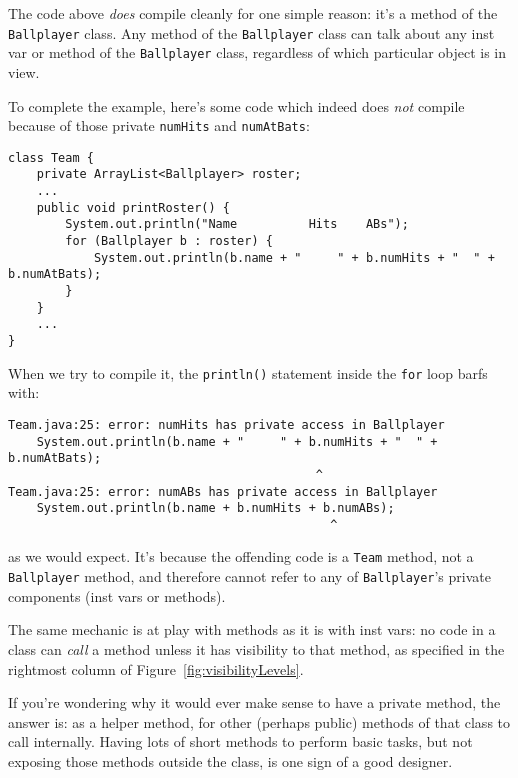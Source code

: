 The code above \textit{does} compile cleanly for one simple reason: it's a
method of the \texttt{Ballplayer} class. Any method of the \texttt{Ballplayer}
class can talk about any inst var or method of the \texttt{Ballplayer} class,
regardless of which particular object is in view.

To complete the example, here's some code which indeed does \textit{not}
compile because of those private \texttt{numHits} and \texttt{numAtBats}:

\begin{Verbatim}[fontsize=\footnotesize,samepage=true,frame=single]
class Team {
    private ArrayList<Ballplayer> roster;
    ...    
    public void printRoster() {
        System.out.println("Name          Hits    ABs");
        for (Ballplayer b : roster) {
            System.out.println(b.name + "     " + b.numHits + "  " + b.numAtBats);
        }
    }
    ...
}
\end{Verbatim}

\begin{samepage}
When we try to compile it, the \texttt{println()} statement inside the
\texttt{for} loop barfs with:
\footnotesize
\begin{verbatim}
Team.java:25: error: numHits has private access in Ballplayer
    System.out.println(b.name + "     " + b.numHits + "  " + b.numAtBats);
                                           ^
Team.java:25: error: numABs has private access in Ballplayer
    System.out.println(b.name + b.numHits + b.numABs);
                                             ^
\end{verbatim}
\normalsize
\vspace{-.2in}
as we would expect. It's because the offending code is a \texttt{Team} method,
not a \texttt{Ballplayer} method, and therefore cannot refer to any of
\texttt{Ballplayer}'s private components (inst vars or methods).
\end{samepage}

The same mechanic is at play with methods as it is with inst vars: no code in
a class can \textit{call} a method unless it has visibility to that method,
as specified in the rightmost column of Figure~\ref{fig:visibilityLevels}.

If you're wondering why it would ever make sense to have a private method, the
answer is: as a helper method, for other (perhaps public) methods of that
class to call internally. Having lots of short methods to perform basic tasks,
but not exposing those methods outside the class, is one sign of a good
designer.

